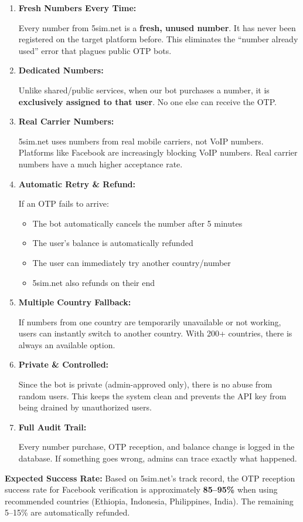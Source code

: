 \begin{enumerate}
    \item \textbf{Fresh Numbers Every Time:}
    
    Every number from 5sim.net is a \textbf{fresh, unused number}. It has never been registered on the target platform before. This eliminates the ``number already used'' error that plagues public OTP bots.

    \item \textbf{Dedicated Numbers:}
    
    Unlike shared/public services, when our bot purchases a number, it is \textbf{exclusively assigned to that user}. No one else can receive the OTP.

    \item \textbf{Real Carrier Numbers:}
    
    5sim.net uses numbers from real mobile carriers, not VoIP numbers. Platforms like Facebook are increasingly blocking VoIP numbers. Real carrier numbers have a much higher acceptance rate.

    \item \textbf{Automatic Retry \& Refund:}
    
    If an OTP fails to arrive:
    \begin{itemize}
        \item The bot automatically cancels the number after 5 minutes
        \item The user's balance is automatically refunded
        \item The user can immediately try another country/number
        \item 5sim.net also refunds on their end
    \end{itemize}

    \item \textbf{Multiple Country Fallback:}
    
    If numbers from one country are temporarily unavailable or not working, users can instantly switch to another country. With 200+ countries, there is always an available option.

    \item \textbf{Private \& Controlled:}
    
    Since the bot is private (admin-approved only), there is no abuse from random users. This keeps the system clean and prevents the API key from being drained by unauthorized users.

    \item \textbf{Full Audit Trail:}
    
    Every number purchase, OTP reception, and balance change is logged in the database. If something goes wrong, admins can trace exactly what happened.
\end{enumerate}

\begin{successbox}
\textbf{Expected Success Rate:} Based on 5sim.net's track record, the OTP reception success rate for Facebook verification is approximately \textbf{85--95\%} when using recommended countries (Ethiopia, Indonesia, Philippines, India). The remaining 5--15\% are automatically refunded.
\end{successbox}
